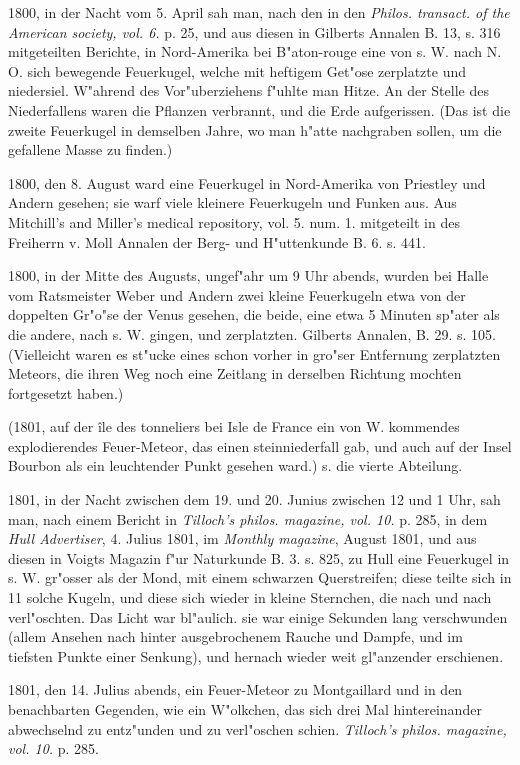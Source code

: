 \documentclass[a4paper, 11pt, oneside, polutonikogreek, german]{article}
\begin{document}
1800, in der Nacht vom 5. April sah man, nach den in den \emph{Philos. transact. of the American society, vol. 6.} p. 25, und aus diesen in Gilberts Annalen B. 13, s. 316 mitgeteilten Berichte, in Nord-Amerika bei B"aton-rouge eine von s. W. nach N. O. sich bewegende Feuerkugel, welche mit heftigem Get"ose zerplatzte und niedersiel. W"ahrend des Vor"uberziehens f"uhlte man Hitze. An der Stelle des Niederfallens waren die Pflanzen verbrannt, und die Erde aufgerissen. (Das ist die zweite Feuerkugel in demselben Jahre, wo man h"atte nachgraben sollen, um die gefallene Masse zu finden.)

1800, den 8. August ward eine Feuerkugel in Nord-Amerika von Priestley und Andern gesehen; sie warf viele kleinere Feuerkugeln und Funken aus. Aus Mitchill's and Miller's medical repository, vol. 5. num. 1. mitgeteilt in des Freiherrn v. Moll Annalen der Berg- und H"uttenkunde B. 6. s. 441.

1800, in der Mitte des Augusts, ungef"ahr um 9 Uhr abends, wurden bei Halle vom Ratsmeister Weber und Andern zwei kleine Feuerkugeln etwa von der doppelten Gr"o"se der Venus gesehen, die beide, eine etwa 5 Minuten sp"ater als die andere, nach s. W. gingen, und zerplatzten. Gilberts Annalen, B. 29. s. 105. (Vielleicht waren es st"ucke eines schon vorher in gro"ser Entfernung zerplatzten Meteors, die ihren Weg noch eine Zeitlang in derselben Richtung mochten fortgesetzt haben.)

(1801, auf der île des tonneliers bei Isle de France ein von W. kommendes explodierendes Feuer-Meteor, das einen steinniederfall gab, und auch auf der Insel Bourbon als ein leuchtender Punkt gesehen ward.) s. die vierte Abteilung.

1801, in der Nacht zwischen dem 19. und 20. Junius zwischen 12 und 1 Uhr, sah man, nach einem Bericht in \emph{Tilloch's philos. magazine, vol. 10.} p. 285, in dem \emph{Hull Advertiser}, 4. Julius 1801, im \emph{Monthly magazine}, August 1801, und aus diesen in Voigts Magazin f"ur Naturkunde B. 3. s. 825, zu Hull eine Feuerkugel in s. W. gr"osser als der Mond, mit einem schwarzen Querstreifen; diese teilte sich in 11 solche Kugeln, und diese sich wieder in kleine Sternchen, die nach und nach verl"oschten. Das Licht war bl"aulich. sie war einige Sekunden lang verschwunden (allem Ansehen nach hinter ausgebrochenem Rauche und Dampfe, und im tiefsten Punkte einer Senkung), und hernach wieder weit gl"anzender erschienen.

1801, den 14. Julius abends, ein Feuer-Meteor zu Montgaillard und in den benachbarten Gegenden, wie ein W"olkchen, das sich drei Mal hintereinander abwechselnd zu entz"unden und zu verl"oschen schien. \emph{Tilloch's philos. magazine, vol. 10.} p. 285.
\end{document}

